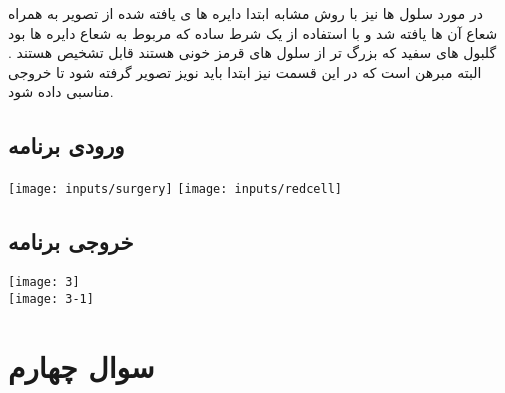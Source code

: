 \documentclass[12pt]{article}
\begin{document}
		در مورد سلول ها نیز با روش مشابه ابتدا دایره ها ی یافته شده از تصویر به همراه شعاع آن ها یافته شد و با استفاده از یک شرط ساده که مربوط به شعاع دایره ها بود گلبول های سفید که بزرگ تر از سلول های قرمز خونی هستند قابل تشخیص هستند . البته مبرهن است که در این قسمت نیز ابتدا باید نویز تصویر گرفته شود تا خروجی مناسبی داده شود.
		
		
		
		\subsection{ورودی برنامه}
		\texttt{[image: inputs/surgery]}
		\texttt{[image: inputs/redcell]}
		\subsection{خروجی برنامه}
		
		\texttt{[image: 3]}\\
		\texttt{[image: 3-1]}
		
		\newpage
		
		\section{سوال چهارم}
\end{document}
